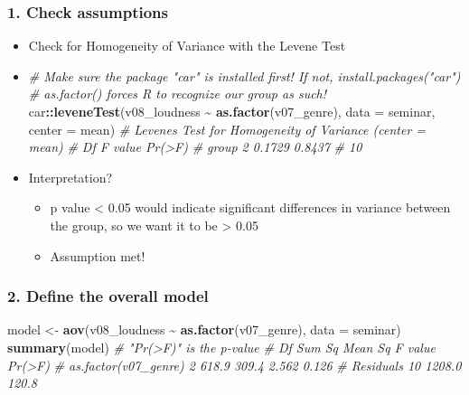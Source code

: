 \documentclass[
]{book}
\newenvironment{Shaded}{\begin{snugshade}}{\end{snugshade}}
\newcommand{\AttributeTok}[1]{\textcolor[rgb]{0.13,0.29,0.53}{#1}}
\newcommand{\CommentTok}[1]{\textcolor[rgb]{0.56,0.35,0.01}{\textit{#1}}}
\newcommand{\FunctionTok}[1]{\textcolor[rgb]{0.13,0.29,0.53}{\textbf{#1}}}
\newcommand{\NormalTok}[1]{#1}
\newcommand{\OtherTok}[1]{\textcolor[rgb]{0.56,0.35,0.01}{#1}}
\newcommand{\SpecialCharTok}[1]{\textcolor[rgb]{0.81,0.36,0.00}{\textbf{#1}}}
\providecommand{\tightlist}{%
  \setlength{\itemsep}{0pt}\setlength{\parskip}{0pt}}
\begin{document}
\subsubsection*{1. Check assumptions}\label{check-assumptions}

\begin{itemize}
\item
  Check for Homogeneity of Variance with the Levene Test
\item
\begin{Shaded}
\begin{Highlighting}[]
\CommentTok{\# Make sure the package "car" is installed first! If not, install.packages("car")}
\CommentTok{\# as.factor() forces R to recognize our group as such!}
\NormalTok{car}\SpecialCharTok{::}\FunctionTok{leveneTest}\NormalTok{(v08\_loudness }\SpecialCharTok{\textasciitilde{}} \FunctionTok{as.factor}\NormalTok{(v07\_genre), }\AttributeTok{data =}\NormalTok{ seminar, }\AttributeTok{center =}\NormalTok{ mean)}
\CommentTok{\# Levene\textquotesingle{}s Test for Homogeneity of Variance (center = mean)}
\CommentTok{\#       Df F value Pr(\textgreater{}F)}
\CommentTok{\# group  2  0.1729 0.8437}
\CommentTok{\#       10}
\end{Highlighting}
\end{Shaded}
\item
  Interpretation?

  \begin{itemize}
  \tightlist
  \item
    p value \textless{} 0.05 would indicate significant differences in variance between the group, so we want it to be \textgreater{} 0.05
  \item
    Assumption met!
  \end{itemize}
\end{itemize}

\subsubsection*{2. Define the overall model}\label{define-the-overall-model}

\begin{Shaded}
\begin{Highlighting}[]
\NormalTok{model }\OtherTok{\textless{}{-}} \FunctionTok{aov}\NormalTok{(v08\_loudness }\SpecialCharTok{\textasciitilde{}} \FunctionTok{as.factor}\NormalTok{(v07\_genre), }\AttributeTok{data =}\NormalTok{ seminar)}
\FunctionTok{summary}\NormalTok{(model) }\CommentTok{\# "Pr(\textgreater{}F)" is the p{-}value}
\CommentTok{\#                      Df Sum Sq Mean Sq F value Pr(\textgreater{}F)}
\CommentTok{\# as.factor(v07\_genre)  2  618.9   309.4   2.562  0.126}
\CommentTok{\# Residuals            10 1208.0   120.8}
\end{Highlighting}
\end{Shaded}
\end{document}

